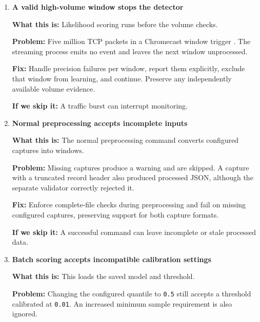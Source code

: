 \documentclass[11pt,a4paper]{article}
\begin{document}
\begin{enumerate}[series=findings]
\item \begin{minipage}[t]{\linewidth}
\textbf{A valid high-volume window stops the detector}


\textbf{What this is:} Likelihood scoring runs before the volume checks.

\textbf{Problem:} Five million TCP packets in a Chromecast window trigger
. The streaming process emits no event and
leaves the next window unprocessed.

\textbf{Fix:} Handle precision failures per window, report them explicitly,
exclude that window from learning, and continue. Preserve any independently
available volume evidence.

\textbf{If we skip it:} A traffic burst can interrupt monitoring.
\end{minipage}

\item \begin{minipage}[t]{\linewidth}
\textbf{Normal preprocessing accepts incomplete inputs}


\textbf{What this is:} The normal preprocessing command converts configured
captures into windows.

\textbf{Problem:} Missing captures produce a warning and are skipped. A capture
with a truncated record header also produced processed JSON, although the
separate validator correctly rejected it.

\textbf{Fix:} Enforce complete-file checks during preprocessing and fail on
missing configured captures, preserving support for both capture formats.

\textbf{If we skip it:} A successful command can leave incomplete or stale
processed data.
\end{minipage}

\item \begin{minipage}[t]{\linewidth}
\textbf{Batch scoring accepts incompatible calibration settings}


\textbf{What this is:} This loads the saved model and threshold.

\textbf{Problem:} Changing the configured quantile to \texttt{0.5} still accepts
a threshold calibrated at \texttt{0.01}. An increased minimum sample requirement
is also ignored.


\end{minipage}
\end{enumerate}
\end{document}
